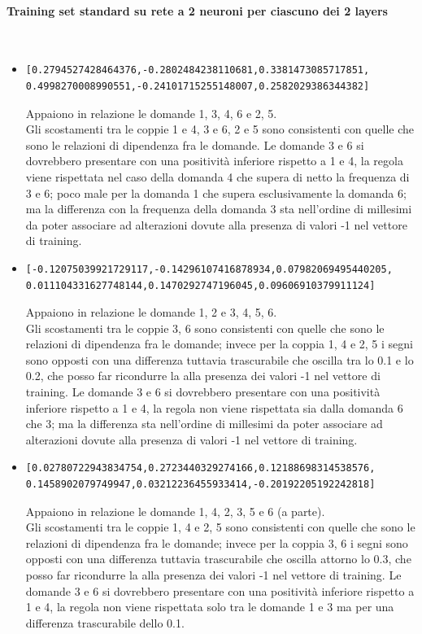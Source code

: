 \paragraph{Training set standard su rete a 2 neuroni per ciascuno dei 2 layers}\mbox{}
\label{Training set standard su rete a 2 neuroni per ciascuno dei 2 layers}
\\
\noindent
\begin{itemize}
\item \begin{verbatim}[0.2794527428464376,-0.2802484238110681,0.3381473085717851,
0.4998270008990551,-0.24101715255148007,0.2582029386344382]\end{verbatim}
Appaiono in relazione le domande 1, 3, 4, 6  e 2, 5.\\
Gli scostamenti tra le coppie  1 e 4, 3 e 6,  2 e 5 sono consistenti con quelle che sono le relazioni di dipendenza fra le domande.
Le domande 3 e 6 si dovrebbero presentare con una positivit\`a inferiore rispetto a 1 e 4, la regola viene rispettata nel caso della domanda 4 che supera di netto la frequenza di 3 e 6; poco male per la domanda 1 che supera esclusivamente la domanda 6; ma la differenza con la frequenza della domanda 3 sta nell'ordine di millesimi da poter associare ad alterazioni dovute alla presenza di valori -1 nel vettore di training.

\item \begin{verbatim}[-0.12075039921729117,-0.14296107416878934,0.07982069495440205,
0.011104331627748144,0.1470292747196045,0.09606910379911124]\end{verbatim}
Appaiono in relazione le domande 1, 2 e 3, 4, 5, 6.\\
Gli scostamenti tra le coppie 3, 6 sono consistenti con quelle che sono le relazioni di dipendenza fra le domande; invece per la coppia 1, 4 e 2, 5 i segni sono opposti con una differenza tuttavia trascurabile  che oscilla tra lo 0.1 e lo 0.2, che posso far ricondurre la alla presenza dei valori -1 nel vettore di training.
Le domande 3 e 6 si dovrebbero presentare con una positivit\`a inferiore rispetto a 1 e 4, la regola non viene rispettata sia dalla domanda 6 che 3; ma la differenza sta nell'ordine di millesimi da poter associare ad alterazioni dovute alla presenza di valori -1 nel vettore di training.

\item \begin{verbatim}[0.02780722943834754,0.2723440329274166,0.12188698314538576,
0.1458902079749947,0.03212236455933414,-0.20192205192242818]
\end{verbatim}
Appaiono in relazione le domande 1, 4, 2, 3, 5 e 6 (a parte).\\
Gli scostamenti tra le coppie 1, 4 e 2, 5 sono consistenti con quelle che sono le relazioni di dipendenza fra le domande; invece per la coppia 3, 6 i segni sono opposti con una differenza tuttavia trascurabile  che oscilla attorno lo 0.3, che posso far ricondurre la alla presenza dei valori -1 nel vettore di training.
Le domande 3 e 6 si dovrebbero presentare con una positivit\`a inferiore rispetto a 1 e 4, la regola non viene rispettata solo tra le domande 1 e 3 ma per una differenza trascurabile dello 0.1.


\end{itemize}
